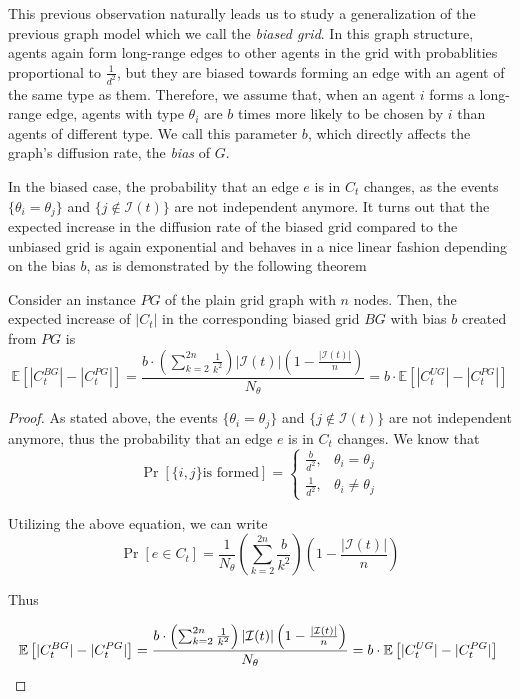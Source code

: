\documentclass[format=acmsmall, review=false]{acmart}
\begin{document}
\par This previous observation naturally leads us to study a generalization of the previous graph model which we call the
\textit{biased grid}. In this graph structure, agents again form long-range edges to other agents in the grid with
probablities proportional to $\frac{1}{d^2}$, but they are biased towards forming an edge with an agent of the same type
as them. Therefore, we assume that, when an agent $i$ forms a long-range edge, agents with type $\theta_i$ are $b$ times
more likely to be chosen by $i$ than agents of different type. We call this parameter $b$, which directly affects the graph's
diffusion rate, the \textit{bias} of $G$.

\par In the biased case, the probability that an edge $e$ is in $C_t$ changes, as the events $\{ \theta_i = \theta_j \}$
and $\{ j \notin \mathcal{I}(t) \}$ are not independent anymore. It turns out that the expected increase in the diffusion
rate of the biased grid compared to the unbiased grid is again exponential and behaves in a nice linear fashion
depending on the bias $b$, as is demonstrated by the following theorem

\begin{theorem}
Consider an instance $PG$ of the plain grid graph with $n$ nodes. Then, the expected increase of $|C_t|$ in the
corresponding biased grid $BG$ with bias $b$ created from $PG$ is
\[
\mathbb{E} \left[ |C^{BG}_t| - |C^{PG}_t| \right] = \frac{b \cdot \left( \sum_{k = 2}^{2n} {\frac{1}{k^2}} \right) |\mathcal{I}(t)| \left( 1 - \frac{|\mathcal{I}(t)|}{n} \right) }{N_\theta} = b \cdot \mathbb{E} \left[ |C^{UG}_t| - |C^{PG}_t| \right] 
\]
\end{theorem}


\begin{proof}
\par As stated above, the events $\{ \theta_i = \theta_j \}$ and $\{ j \notin \mathcal{I}(t) \}$ are not independent
anymore, thus the probability that an edge $e$ is in $C_t$ changes. We know that
\[
\Pr \left[ \{i, j \} \text{is formed} \right] = \begin{cases}
\frac{b}{d^2}, & \theta_i = \theta_j \\ 
\frac{1}{d^2}, & \theta_i \neq \theta_j
\end{cases}
\]

\par Utilizing the above equation, we can write
\[
\Pr \left[ e \in C_t \right] = \frac{1}{N_\theta} \left( \sum_{k = 2}^{2n} {\frac{b}{k^2}} \right) \left( 1 - \frac{|\mathcal{I}(t)|}{n} \right)
\]

\par Thus

\[
\mathbb{E} \left[ |C^{BG}_t| - |C^{PG}_t| \right] = \frac{b \cdot \left( \sum_{k = 2}^{2n} {\frac{1}{k^2}} \right) |\mathcal{I}(t)| \left( 1 - \frac{|\mathcal{I}(t)|}{n} \right) }{N_\theta} = b \cdot \mathbb{E} \left[ |C^{UG}_t| - |C^{PG}_t| \right] \qedhere
\]
\end{proof}
\end{document}
